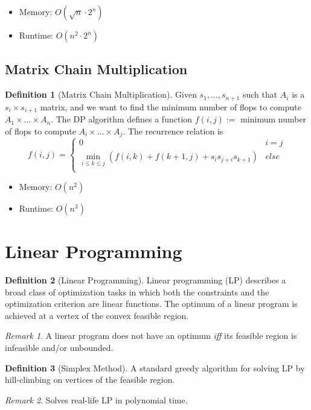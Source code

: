 \documentclass[11pt]{article}
\theoremstyle{definition}
\newtheorem{definition}{Definition}[section]
\theoremstyle{remark}
\newtheorem*{remark}{Remark}
\begin{document}
\begin{itemize}
\item Memory: $O(\sqrt{n} \cdot 2^n)$
\item Runtime: $O(n^2 \cdot 2^n)$
\end{itemize}


\subsection{Matrix Chain Multiplication}
\begin{definition}[Matrix Chain Multiplication]
Given $s_1,\dots,s_{n+1}$ such that $A_i$ is a $s_i \times s_{i+1}$ matrix, and we want to find the minimum number of flops to compute $A_1 \times \dots \times A_n$. The DP algorithm defines a function $f(i,j):=$ minimum number of flops to compute $A_i \times \dots \times A_j$. The recurrence relation is
\[
f(i,j) = \begin{cases}
0 & i = j \\
\min_{i\leq k\leq j} \left(f(i,k) + f(k+1, j) + s_i s_{j+i} s_{k+1}  \right) & else \\
\end{cases}
\]
\end{definition}

\begin{itemize}
\item Memory: $O(n^2)$
\item Runtime: $O(n^3)$
\end{itemize}

\clearpage

\section{Linear Programming}
\begin{definition}[Linear Programming] Linear programming (LP) describes a broad class of optimization tasks in which both the constraints and the optimization criterion are linear functions. The optimum of a linear program is achieved at a vertex of the convex feasible region.
\end{definition}

\begin{remark}
A linear program does not have an optimum \textit{iff} its feasible region is infeasible and/or unbounded.
\end{remark}

\begin{definition}[Simplex Method]
A standard greedy algorithm for solving LP by hill-climbing on vertices of the feasible region.
\end{definition}
\begin{remark}
Solves real-life LP in polynomial time.
\end{remark}
\end{document}
